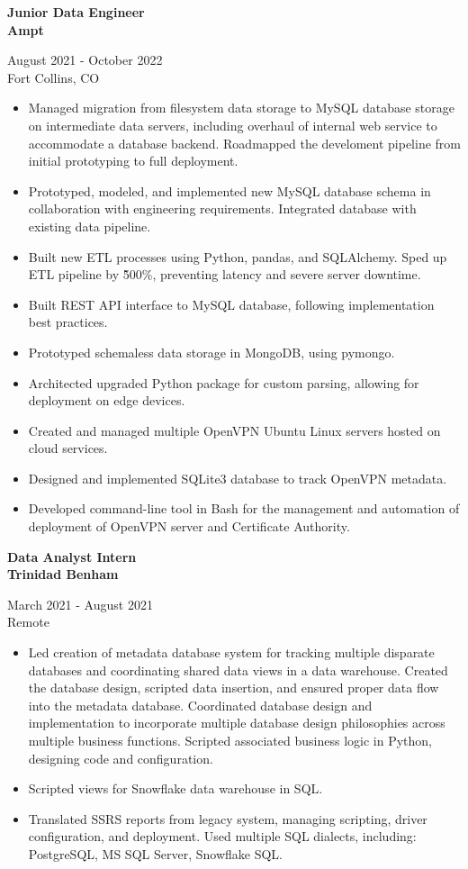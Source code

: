 \documentclass{article}
\newcommand{\resumeSubheading}[5]{
\noindent\begin{minipage}{0.5\textwidth}
	\begin{flushleft}
	\textbf{#1}\\
	\textbf{#2}\\
	\end{flushleft}
\end{minipage}%
\hfill
\begin{minipage}{0.5\textwidth}
	\begin{flushright}
	#3\\
	#4\\
	\end{flushright}
\end{minipage}%
\newline
#5
}
\begin{document}
\resumeSubheading{Junior Data Engineer}{Ampt}{August 2021 - October 2022}{Fort Collins, CO}{
\begin{itemize}

	\item Managed migration from filesystem data storage to MySQL
		database storage on intermediate data servers,
		including overhaul of internal web service to accommodate
		a database backend.
		Roadmapped the develoment pipeline from initial prototyping
		to full deployment.
	\item Prototyped, modeled, and implemented new MySQL database schema in
		collaboration with engineering requirements.
		Integrated database with existing data pipeline. 
	\item Built new ETL processes using Python, pandas, and SQLAlchemy.
		Sped up ETL pipeline by \~500\%, preventing latency and severe
		server downtime.
	\item Built REST API interface to MySQL database, following
		implementation best practices.
	\item Prototyped schemaless data storage in MongoDB, using pymongo. 
	\item Architected upgraded Python package for custom
		parsing, 
		allowing for deployment on edge devices.
	\item Created and managed multiple OpenVPN Ubuntu Linux servers
		hosted on cloud services.
	\item Designed and implemented SQLite3 database to track OpenVPN metadata.
	\item Developed command-line
		tool in Bash for the management and automation of
		deployment of OpenVPN server and Certificate Authority.
\end{itemize}
}

\resumeSubheading{Data Analyst Intern}{Trinidad Benham}{March 2021 - August 2021}{Remote}{
\begin{itemize}

\item Led creation of metadata database system for tracking multiple disparate
	databases and coordinating shared data views in a data warehouse.
	Created the database design, scripted data insertion, and ensured
	proper data flow into the metadata database. Coordinated database
	design and implementation to incorporate multiple database design
	philosophies across multiple business functions. Scripted associated
	business logic in Python, designing code and configuration.

\item Scripted views for Snowflake data warehouse in SQL. 

\item Translated SSRS reports from legacy system, managing scripting, driver
	configuration, and deployment. Used multiple SQL dialects, including:
	PostgreSQL, MS SQL Server, Snowflake SQL.

\end{itemize}
}
\end{document}
